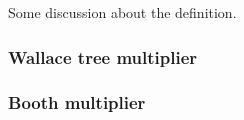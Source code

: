
\begin{df}
  
\end{df}

Some discussion about the definition.

\begin{example}
  
\end{example}


\subsubsection{Wallace tree multiplier}

\subsubsection{Booth multiplier}







